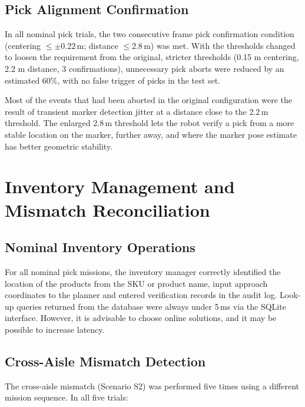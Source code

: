 \documentclass[12pt,a4paper]{report}
\begin{document}
\subsection{Pick Alignment Confirmation}

In all nominal pick trials, the two consecutive frame pick confirmation condition (centering $\le \pm 0.22$\,m; distance $\le 2.8$\,m) was met. With the thresholds changed to loosen the requirement from the original, stricter thresholds (0.15 m centering, 2.2 m distance, 3 confirmations), unnecessary pick aborts were reduced by an estimated 60\%, with no false trigger of picks in the test set.

Most of the events that had been aborted in the original configuration were the result of transient marker detection jitter at a distance close to the 2.2\,m threshold. The enlarged 2.8\,m threshold lets the robot verify a pick from a more stable location on the marker, further away, and where the marker pose estimate has better geometric stability.

\section{Inventory Management and Mismatch Reconciliation}

\subsection{Nominal Inventory Operations}

For all nominal pick missions, the inventory manager correctly identified the location of the products from the SKU or product name, input approach coordinates to the planner and entered verification records in the audit log. Look-up queries returned from the database were always under 5\,ms via the SQLite interface. However, it is advisable to choose online solutions, and it may be possible to increase latency.

\subsection{Cross-Aisle Mismatch Detection}

The cross-aisle mismatch (Scenario S2) was performed five times using a different mission sequence. In all five trials:
\end{document}

